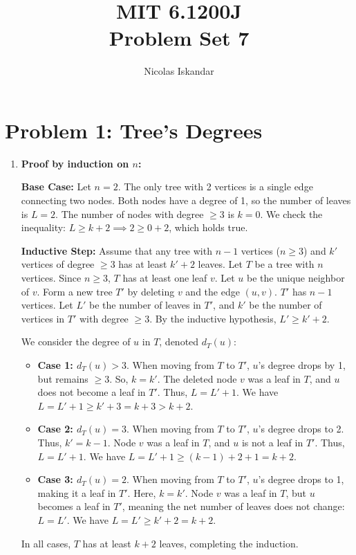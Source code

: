 \documentclass[11pt]{article}
\title{
    \vspace{-2em}
    MIT 6.1200J \\
    Problem Set 7
}
\author{Nicolas Iskandar}
\date{}
\begin{document}
\maketitle

\section*{Problem 1: Tree's Degrees}

\begin{enumerate}[label=\textbf{(\alph*)}]
    \item \textbf{Proof by induction on $n$:} 
    
    \textbf{Base Case:} Let $n = 2$. The only tree with 2 vertices is a single edge connecting two nodes. Both nodes have a degree of 1, so the number of leaves is $L = 2$. The number of nodes with degree $\ge 3$ is $k = 0$. We check the inequality: $L \ge k + 2 \implies 2 \ge 0 + 2$, which holds true.

    \textbf{Inductive Step:} Assume that any tree with $n-1$ vertices ($n \ge 3$) and $k'$ vertices of degree $\ge 3$ has at least $k' + 2$ leaves.
    Let $T$ be a tree with $n$ vertices. Since $n \ge 3$, $T$ has at least one leaf $v$. Let $u$ be the unique neighbor of $v$. 
    Form a new tree $T'$ by deleting $v$ and the edge $(u,v)$. $T'$ has $n-1$ vertices. Let $L'$ be the number of leaves in $T'$, and $k'$ be the number of vertices in $T'$ with degree $\ge 3$. By the inductive hypothesis, $L' \ge k' + 2$.
    
    We consider the degree of $u$ in $T$, denoted $d_T(u)$:
    \begin{itemize}
        \item \textbf{Case 1: $d_T(u) > 3$}. When moving from $T$ to $T'$, $u$'s degree drops by 1, but remains $\ge 3$. So, $k = k'$. The deleted node $v$ was a leaf in $T$, and $u$ does not become a leaf in $T'$. Thus, $L = L' + 1$. We have $L = L' + 1 \ge k' + 3 = k + 3 > k + 2$.
        \item \textbf{Case 2: $d_T(u) = 3$}. When moving from $T$ to $T'$, $u$'s degree drops to 2. Thus, $k' = k - 1$. Node $v$ was a leaf in $T$, and $u$ is not a leaf in $T'$. Thus, $L = L' + 1$. We have $L = L' + 1 \ge (k - 1) + 2 + 1 = k + 2$.
        \item \textbf{Case 3: $d_T(u) = 2$}. When moving from $T$ to $T'$, $u$'s degree drops to 1, making it a leaf in $T'$. Here, $k = k'$. Node $v$ was a leaf in $T$, but $u$ becomes a leaf in $T'$, meaning the net number of leaves does not change: $L = L'$. We have $L = L' \ge k' + 2 = k + 2$.
    \end{itemize}
    In all cases, $T$ has at least $k + 2$ leaves, completing the induction.


\end{enumerate}
\end{document}
